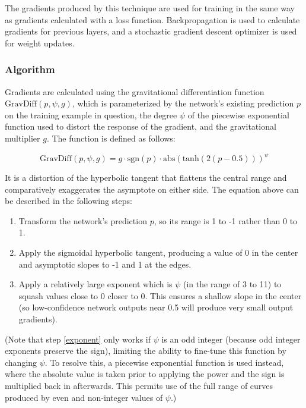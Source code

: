 \documentclass[10pt]{article}
\begin{document}
The gradients produced by this technique are used for training in the same way as gradients calculated with a loss function. Backpropagation is used to calculate gradients for previous layers, and a stochastic gradient descent optimizer \cite{sgd} is used for weight updates.

\subsubsection{Algorithm}

Gradients are calculated using the gravitational differentiation function $\mathrm{GravDiff}(p, \psi, g)$, which is parameterized by the network's existing prediction $p$ on the training example in question, the degree $\psi$ of the piecewise exponential function used to distort the response of the gradient, and the gravitational multiplier $g$. The function is defined as follows:

\begin{equation}
    \mathrm{GravDiff}(p, \psi, g) = g \cdot \mathrm{sgn}(p) \cdot \mathrm{abs}(\mathrm{tanh}(2(p - 0.5))) ^ \psi
\end{equation}

It is a distortion of the hyperbolic tangent that flattens the central range and comparatively exaggerates the asymptote on either side. The equation above can be described in the following steps:

\begin{enumerate}
    \item Transform the network's prediction $p$, so its range is 1 to -1 rather than 0 to 1.
    \item Apply the sigmoidal hyperbolic tangent, producing a value of 0 in the center and asymptotic slopes to -1 and 1 at the edges.
    \item \label{exponent} Apply a relatively large exponent which is $\psi$ (in the range of 3 to 11) to squash values close to 0 closer to 0. This ensures a shallow slope in the center (so low-confidence network outputs near 0.5 will produce very small output gradients).
\end{enumerate}

(Note that step \ref{exponent} only works if $\psi$ is an odd integer (because odd integer exponents preserve the sign), limiting the ability to fine-tune this function by changing $\psi$. To resolve this, a piecewise exponential function is used instead, where the absolute value is taken prior to applying the power and the sign is multiplied back in afterwards. This permits use of the full range of curves produced by even and non-integer values of $\psi$.)
\end{document}
